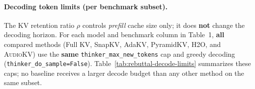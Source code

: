 \begin{answer}
    \paragraph{Decoding token limits (per benchmark subset).}
    The KV retention ratio $\rho$ controls \emph{prefill} cache size only; it does \textbf{not} change the decoding horizon.
    For each model and benchmark column in Table~1, \textbf{all} compared methods (Full KV, SnapKV, AdaKV, PyramidKV, H2O, and \textsc{AudioKV}) use the \textbf{same} \texttt{thinker\_max\_new\_tokens} cap and greedy decoding (\texttt{thinker\_do\_sample=False}).
    Table~\ref{tab:rebuttal-decode-limits} summarizes these caps; no baseline receives a larger decode budget than any other method on the same subset.
    
    \begin{table}[t]
    \centering
    \small
    \setlength{\tabcolsep}{4pt}
    \caption{\textbf{Maximum decoding tokens (\texttt{thinker\_max\_new\_tokens}) for each Table~1 subset.}
    Identical for all methods under the same model and subset. ``Dynamic'' entries are computed per utterance from audio duration $T$ (seconds).}
    \label{tab:rebuttal-decode-limits}
    \end{table}

\end{answer}
